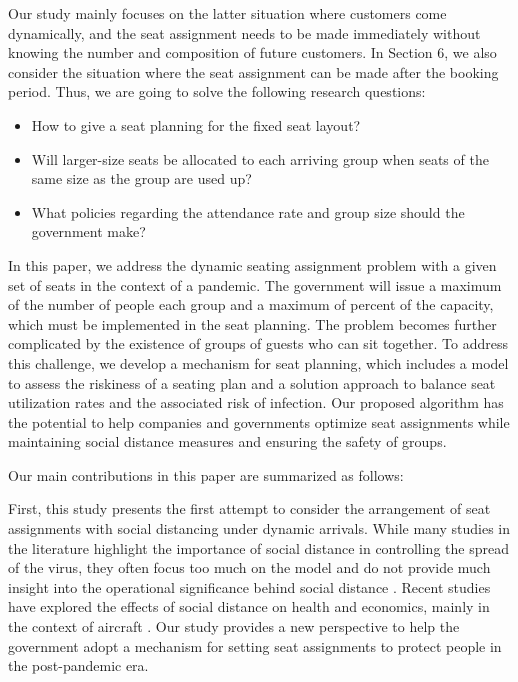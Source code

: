 Our study mainly focuses on the latter situation where customers come dynamically, and the seat assignment needs to be made immediately without knowing the number and composition of future customers. In Section 6, we also consider the situation where the seat assignment can be made after the booking period. Thus, we are going to solve the following research questions:

\begin{itemize}
\item How to give a seat planning for the fixed seat layout? 
\item Will larger-size seats be allocated to each arriving group when seats of the same size as the group are used up? 
\item What policies regarding the attendance rate and group size should the government make?
\end{itemize}


In this paper, we address the dynamic seating assignment problem with a given set of seats in the context of a pandemic. The government will issue a maximum of the number of people each group and a maximum of percent of the capacity, which must be implemented in the seat planning. The problem becomes further complicated by the existence of groups of guests who can sit together. To address this challenge, we develop a mechanism for seat planning, which includes a model to assess the riskiness of a seating plan and a solution approach to balance seat utilization rates and the associated risk of infection. Our proposed algorithm has the potential to help companies and governments optimize seat assignments while maintaining social distance measures and ensuring the safety of groups. 



Our main contributions in this paper are summarized as follows:

First, this study presents the first attempt to consider the arrangement of seat assignments with social distancing under dynamic arrivals. While many studies in the literature highlight the importance of social distance in controlling the spread of the virus, they often focus too much on the model and do not provide much insight into the operational significance behind social distance \cite{barry2021optimal, fischetti2021safe}. Recent studies have explored the effects of social distance on health and economics, mainly in the context of aircraft \cite{salari2020social, ghorbani2020model, salari2022social}. Our study provides a new perspective to help the government adopt a mechanism for setting seat assignments to protect people in the post-pandemic era.

